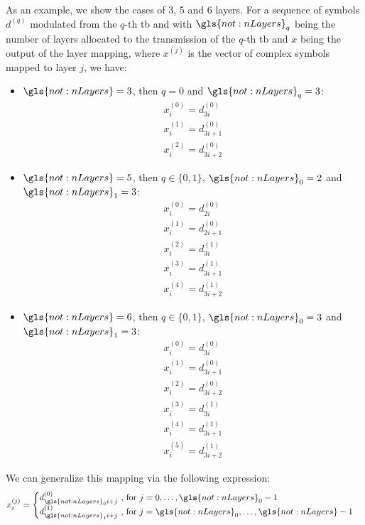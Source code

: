 As an example, we show the cases of 3, 5 and 6 layers.
%
For a sequence of symbols $d^{(q)}$ modulated from the $q$-th \gls{tb} and with
$\gls{not:nLayers}_q$ being the number of layers allocated to the transmission of the $q$-th \gls{tb} and $x$ being the output of the layer mapping, where $x^{(j)}$ is the vector of complex symbols mapped to layer $j$, we have:
%
\begin{itemize}
    \item $\gls{not:nLayers} = 3 $, then $q=0$ and $\gls{not:nLayers}_q = 3$:
    $$
    \begin{gathered}
        x^{(0)}_{i} = d^{(0)}_{3 i} \\
        x^{(1)}_{i} = d^{(0)}_{3 i + 1} \\
        x^{(2)}_{i} = d^{(0)}_{3 i + 2}
    \end{gathered}
    $$
    \item $\gls{not:nLayers} = 5 $, then $q \in \{0,1\}$, $\gls{not:nLayers}_0 = 2$ and $\gls{not:nLayers}_1 = 3$:
    $$
    \begin{gathered}
        x^{(0)}_{i} = d^{(0)}_{2 i} \\
        x^{(1)}_{i} = d^{(0)}_{2 i + 1} \\
        x^{(2)}_{i} = d^{(1)}_{3 i} \\
        x^{(3)}_{i} = d^{(1)}_{3 i + 1} \\
        x^{(4)}_{i} = d^{(1)}_{3 i + 2}
    \end{gathered}
    $$
    \item $\gls{not:nLayers} = 6 $, then $q \in \{0,1\}$, $\gls{not:nLayers}_0 = 3$ and $\gls{not:nLayers}_1 = 3$:
    $$
    \begin{gathered}
        x^{(0)}_{i} = d^{(0)}_{3 i} \\
        x^{(1)}_{i} = d^{(0)}_{3 i + 1} \\
        x^{(2)}_{i} = d^{(0)}_{3 i + 2} \\
        x^{(3)}_{i} = d^{(1)}_{3 i} \\
        x^{(4)}_{i} = d^{(1)}_{3 i + 1} \\
        x^{(5)}_{i} = d^{(1)}_{3 i + 2}
    \end{gathered}
    $$
\end{itemize}

We can generalize this mapping via the following expression:
%
\begin{equation}
    x^{(j)}_{i} =
    \begin{cases}
          d^{(0)}_{\gls{not:nLayers}_0 i + j} \text{ , for } j=0,\ldots, \gls{not:nLayers}_0 - 1 \\
         d^{(1)}_{\gls{not:nLayers}_1 i + j} \text{ , for } j=\gls{not:nLayers}_0, \ldots, \gls{not:nLayers} - 1
    \end{cases}
\end{equation}


